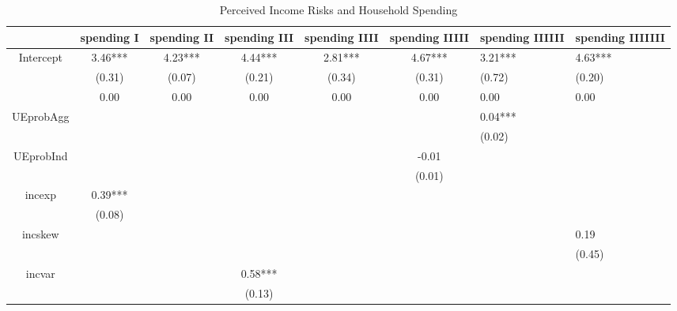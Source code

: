 \begin{table}[p]
\centering
\begin{adjustbox}{width={0.9\textwidth}}
\begin{threeparttable}
\caption{Perceived Income Risks and Household Spending}
\label{spending_reg}\begin{tabular}{ccccccll}
\toprule
{} & spending I & spending II & spending III & spending IIII & spending IIIII & spending IIIIII & spending IIIIIII \\
\midrule
Intercept &    3.46*** &     4.23*** &      4.44*** &       2.81*** &        4.67*** &         3.21*** &          4.63*** \\
          &     (0.31) &      (0.07) &       (0.21) &        (0.34) &         (0.31) &          (0.72) &           (0.20) \\
          &       0.00 &        0.00 &         0.00 &          0.00 &           0.00 &            0.00 &             0.00 \\
UEprobAgg &            &             &              &               &                &         0.04*** &                  \\
          &            &             &              &               &                &          (0.02) &                  \\
UEprobInd &            &             &              &               &          -0.01 &                 &                  \\
          &            &             &              &               &         (0.01) &                 &                  \\
incexp    &    0.39*** &             &              &               &                &                 &                  \\
          &     (0.08) &             &              &               &                &                 &                  \\
incskew   &            &             &              &               &                &                 &             0.19 \\
          &            &             &              &               &                &                 &           (0.45) \\
incvar    &            &             &      0.58*** &               &                &                 &                  \\
          &            &             &       (0.13) &               &                &                 &                  \\

\end{tabular}
\end{threeparttable}
\end{adjustbox}
\end{table}
